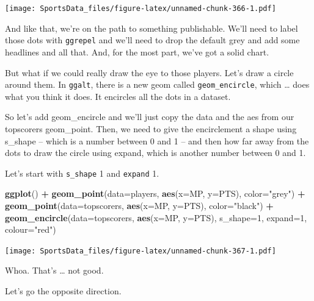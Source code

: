 \documentclass[
]{book}
\newenvironment{Shaded}{\begin{snugshade}}{\end{snugshade}}
\newcommand{\DataTypeTok}[1]{\textcolor[rgb]{0.13,0.29,0.53}{#1}}
\newcommand{\DecValTok}[1]{\textcolor[rgb]{0.00,0.00,0.81}{#1}}
\newcommand{\KeywordTok}[1]{\textcolor[rgb]{0.13,0.29,0.53}{\textbf{#1}}}
\newcommand{\NormalTok}[1]{#1}
\newcommand{\OperatorTok}[1]{\textcolor[rgb]{0.81,0.36,0.00}{\textbf{#1}}}
\newcommand{\StringTok}[1]{\textcolor[rgb]{0.31,0.60,0.02}{#1}}
\begin{document}
\texttt{[image: SportsData\_files/figure-latex/unnamed-chunk-366-1.pdf]}

And like that, we're on the path to something publishable. We'll need to label those dots with \texttt{ggrepel} and we'll need to drop the default grey and add some headlines and all that. And, for the most part, we've got a solid chart.

But what if we could really draw the eye to those players. Let's draw a circle around them.
In \texttt{ggalt}, there is a new geom called \texttt{geom\_encircle}, which \ldots{} does what you think it does. It encircles all the dots in a dataset.

So let's add geom\_encircle and we'll just copy the data and the aes from our topscorers geom\_point. Then, we need to give the encirclement a shape using s\_shape -- which is a number between 0 and 1 -- and then how far away from the dots to draw the circle using expand, which is another number between 0 and 1.

Let's start with \texttt{s\_shape} 1 and \texttt{expand} 1.

\begin{Shaded}
\begin{Highlighting}[]
\KeywordTok{ggplot}\NormalTok{() }\OperatorTok{+}\StringTok{ }
\StringTok{  }\KeywordTok{geom_point}\NormalTok{(}\DataTypeTok{data=}\NormalTok{players, }\KeywordTok{aes}\NormalTok{(}\DataTypeTok{x=}\NormalTok{MP, }\DataTypeTok{y=}\NormalTok{PTS), }\DataTypeTok{color=}\StringTok{"grey"}\NormalTok{) }\OperatorTok{+}\StringTok{ }
\StringTok{  }\KeywordTok{geom_point}\NormalTok{(}\DataTypeTok{data=}\NormalTok{topscorers, }\KeywordTok{aes}\NormalTok{(}\DataTypeTok{x=}\NormalTok{MP, }\DataTypeTok{y=}\NormalTok{PTS), }\DataTypeTok{color=}\StringTok{"black"}\NormalTok{) }\OperatorTok{+}\StringTok{ }
\StringTok{  }\KeywordTok{geom_encircle}\NormalTok{(}\DataTypeTok{data=}\NormalTok{topscorers, }\KeywordTok{aes}\NormalTok{(}\DataTypeTok{x=}\NormalTok{MP, }\DataTypeTok{y=}\NormalTok{PTS), }\DataTypeTok{s_shape=}\DecValTok{1}\NormalTok{, }\DataTypeTok{expand=}\DecValTok{1}\NormalTok{, }\DataTypeTok{colour=}\StringTok{"red"}\NormalTok{)}
\end{Highlighting}
\end{Shaded}

\texttt{[image: SportsData\_files/figure-latex/unnamed-chunk-367-1.pdf]}

Whoa. That's \ldots{} not good.

Let's go the opposite direction.
\end{document}
